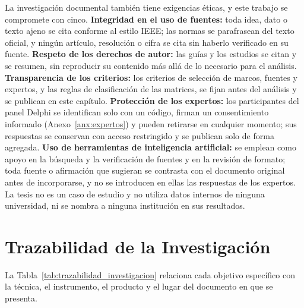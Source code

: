 La investigación documental también tiene exigencias éticas, y este trabajo se compromete con cinco. \textbf{Integridad en el uso de fuentes:} toda idea, dato o texto ajeno se cita conforme al estilo IEEE; las normas se parafrasean del texto oficial, y ningún artículo, resolución o cifra se cita sin haberlo verificado en su fuente. \textbf{Respeto de los derechos de autor:} las guías y los estudios se citan y se resumen, sin reproducir su contenido más allá de lo necesario para el análisis. \textbf{Transparencia de los criterios:} los criterios de selección de marcos, fuentes y expertos, y las reglas de clasificación de las matrices, se fijan antes del análisis y se publican en este capítulo. \textbf{Protección de los expertos:} los participantes del panel Delphi se identifican solo con un código, firman un consentimiento informado (Anexo~\ref{anx:expertos}) y pueden retirarse en cualquier momento; sus respuestas se conservan con acceso restringido y se publican solo de forma agregada. \textbf{Uso de herramientas de inteligencia artificial:} se emplean como apoyo en la búsqueda y la verificación de fuentes y en la revisión de formato; toda fuente o afirmación que sugieran se contrasta con el documento original antes de incorporarse, y no se introducen en ellas las respuestas de los expertos. La tesis no es un caso de estudio y no utiliza datos internos de ninguna universidad, ni se nombra a ninguna institución en sus resultados.

\section{Trazabilidad de la Investigación}
\label{sec:trazabilidad_investigacion}

La Tabla~\ref{tab:trazabilidad_investigacion} relaciona cada objetivo específico con la técnica, el instrumento, el producto y el lugar del documento en que se presenta.

